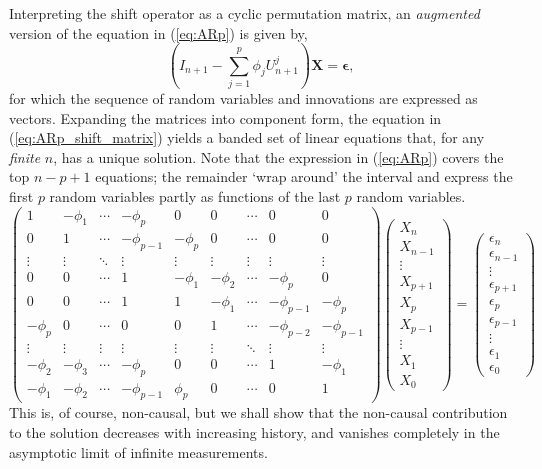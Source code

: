 \documentclass[12pt, twoside, draft]{article}
\begin{document}
Interpreting the shift operator as a cyclic permutation matrix, an \textit{augmented} version of the equation in (\ref{eq:ARp}) is given by,
\begin{equation}\label{eq:ARp_shift_matrix}
\left( I_{n+1} - \sum_{j=1}^p \phi_j U_{n+1}^j \right) \boldsymbol{X} = \boldsymbol{\epsilon},
\end{equation}
for which the sequence of random variables and innovations are expressed as vectors.  Expanding the matrices into component form, the equation in (\ref{eq:ARp_shift_matrix}) yields a banded set of linear equations that, for any \textit{finite} $n$, has a unique solution.  Note that the expression in (\ref{eq:ARp}) covers the top $n-p+1$ equations; the remainder `wrap around' the interval and express the first $p$ random variables partly as functions of the last $p$ random variables. 
\begin{equation}
\begin{pmatrix}
1 & -\phi_1 & \cdots & -\phi_p & 0 & 0 & \cdots & 0 & 0 \\
0 & 1 & \cdots & -\phi_{p-1} & -\phi_p & 0 & \cdots & 0 & 0 \\
\vdots & \vdots & \ddots & \vdots & \vdots & \vdots & \vdots & \vdots & \vdots \\
0 & 0 & \cdots & 1 & -\phi_1 & -\phi_2 & \cdots & -\phi_p & 0 \\
0 & 0 & \cdots & 1 & 1 & -\phi_1 & \cdots & -\phi_{p-1} & -\phi_p \\
-\phi_p & 0 & \cdots & 0 & 0 & 1 & \cdots & -\phi_{p-2} & -\phi_{p-1} \\
\vdots & \vdots & \vdots & \vdots & \vdots & \vdots & \ddots & \vdots & \vdots \\
-\phi_2 & -\phi_3 & \cdots & -\phi_p & 0 & 0 & \cdots & 1 & -\phi_1 \\
-\phi_1 & -\phi_2 & \cdots & -\phi_{p-1} & \phi_p & 0 & \cdots & 0 & 1
\end{pmatrix}
\begin{pmatrix}
X_n \\
X_{n-1} \\
\vdots \\
X_{p+1} \\
X_p \\
X_{p-1} \\
\vdots \\
X_1 \\
X_0
\end{pmatrix} =
\begin{pmatrix}
\epsilon_n \\
\epsilon_{n-1} \\
\vdots \\
\epsilon_{p+1} \\
\epsilon_p \\
\epsilon_{p-1} \\
\vdots \\
\epsilon_1 \\
\epsilon_0
\end{pmatrix}
\end{equation}
 This is, of course, non-causal, but we shall show that the non-causal contribution to the solution decreases with increasing history, and vanishes completely in the asymptotic limit  of infinite measurements.
\end{document}

